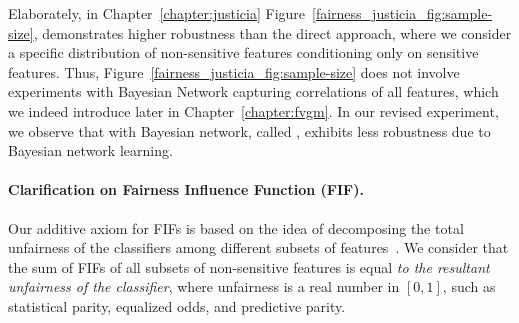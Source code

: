 Elaborately, in Chapter~\ref{chapter:justicia} Figure~\ref{fairness_justicia_fig:sample-size}, {\justicia} demonstrates higher robustness than the direct approach, where we consider a specific distribution of non-sensitive features conditioning only on sensitive features. Thus, Figure~\ref{fairness_justicia_fig:sample-size} does not involve experiments with Bayesian Network capturing correlations of all features, which we indeed introduce later in Chapter~\ref{chapter:fvgm}. In our revised experiment, we observe that {\justicia} with Bayesian network, called {\fvgm}, exhibits less robustness due to Bayesian network learning.


\paragraph{Clarification on Fairness Influence Function (FIF).} Our additive axiom for FIFs is based on the idea of decomposing the total unfairness of the classifiers among different subsets of features~\cite{begley2020explainability,lundberg2020explaining}. We consider that the sum of FIFs of all subsets of non-sensitive features is equal \textit{to the resultant unfairness of the classifier}, where unfairness is a real number in $ [0,1] $, such as statistical parity, equalized odds, and predictive parity.  

